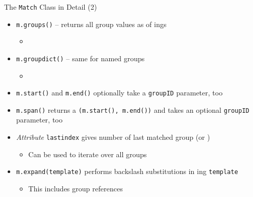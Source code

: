 \begin{frame}{The \texttt{Match} Class in Detail (2)}
%
\begin{itemize}
\item \texttt{m.groups()} -- returns all group values as  of ings
	\begin{itemize}
	\item[\Thus]  \thus {}
	\end{itemize}
\pause
\item \texttt{m.groupdict()} -- same for named groups
	\begin{itemize}
	\item [\Thus]  \\
	               \thus {}
	\end{itemize}
\pause
\item \texttt{m.start()} and \texttt{m.end()} optionally take a \texttt{groupID} parameter, too
\item \texttt{m.span()} returns a  \texttt{(m.start(), m.end())} and takes an optional \texttt{groupID} parameter, too
\pause
\item \emph{Attribute} \texttt{lastindex} gives number of last matched group (or )
	\begin{itemize}
	\item[\Thus] Can be used to iterate over all groups
	\end{itemize}
\pause
\item \texttt{m.expand(template)} performs backslash substitutions in ing \texttt{template}
	\begin{itemize}
	\item This includes group references
	\end{itemize}
\end{itemize}
%
\end{frame}


